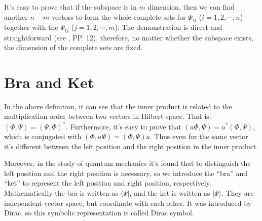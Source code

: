 It's easy to prove that if the subspace is in $m$ dimension, then we
can find another $n-m$ vectors to form the whole complete sets for
$\Psi_{ij}$ ($i=1,2,\cdots, n$) together with the $\Psi_{ij}$
($j=1,2, \cdots, m$). The demonstration is direct and
straightforward (see \cite{XingLinKe}, PP. 12). therefore, no matter
whether the subspace exists, the dimension of the complete sets are
fixed.




\section{Bra and Ket}
%
%
In the above definition, it can see that the inner product is related
to the multiplication order between two vectors in Hilbert space. That
is: $(\Phi,\Psi) = (\Psi, \Phi)^{*}$.  Furthermore, it's easy to prove
that $(a\Phi,\Psi) = a^{*}(\Phi,\Psi)$, which is conjugated with
$(\Phi,a\Psi) = (\Phi,\Psi)a$. Thus even for the same vector it's
different between the left position and the right position in the
inner product.

Moreover, in the study of quantum mechanics it's found that to
distinguish the left position and the right position is necessary,
so we introduce the ``bra'' and ``ket'' to represent the left
position and right position, respectively. Mathematically the bra is
written as $\langle\Psi|$, and the ket is written as $|\Psi\rangle$.
They are independent vector space, but coordinate with each other.
It was introduced by Dirac, so this symbolic representation is
called Dirac symbol.


